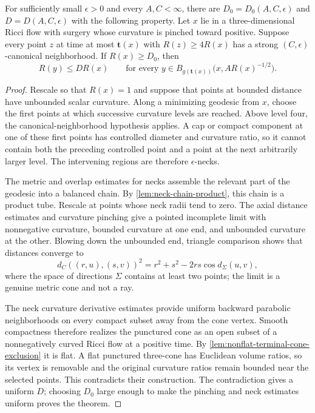 \begin{theorem}
\label{thm:bounded-curvature-at-bounded-distance}
\notready
For sufficiently small $\epsilon>0$ and every $A,C<\infty$, there are
$D_0=D_0(A,C,\epsilon)$ and $D=D(A,C,\epsilon)$ with the following
property.  Let $x$ lie in a three-dimensional Ricci flow with surgery whose
curvature is pinched toward positive.  Suppose every point $z$ at time at
most $\mathbf t(x)$ with $R(z)\ge4R(x)$ has a strong
$(C,\epsilon)$-canonical neighborhood.  If $R(x)\ge D_0$, then
\[
 R(y)\le D R(x)
 \qquad\text{for every }y\in
 B_{g(\mathbf t(x))}\bigl(x,A R(x)^{-1/2}\bigr).
\]
\end{theorem}

\begin{proof}
Rescale so that $R(x)=1$ and suppose that points at bounded distance have
unbounded scalar curvature.  Along a minimizing geodesic from $x$, choose
the first points at which successive curvature levels are reached.  Above
level four, the canonical-neighborhood hypothesis applies.  A cap or compact
component at one of these first points has controlled diameter and curvature
ratio, so it cannot contain both the preceding controlled point and a point
at the next arbitrarily larger level.  The intervening regions are therefore
$\epsilon$-necks.

The metric and overlap estimates for necks assemble the relevant part of the
geodesic into a balanced chain.  By \ref{lem:neck-chain-product}, this chain
is a product tube.  Rescale at points whose neck radii tend to zero.  The
axial distance estimates and curvature pinching give a pointed incomplete
limit with nonnegative curvature, bounded curvature at one end, and
unbounded curvature at the other.  Blowing down the unbounded end, triangle
comparison shows that distances converge to
\[
 d_C((r,u),(s,v))^2=r^2+s^2-2rs\cos d_\Sigma(u,v),
\]
where the space of directions $\Sigma$ contains at least two points; the
limit is a genuine metric cone and not a ray.

The neck curvature derivative estimates provide uniform backward parabolic
neighborhoods on every compact subset away from the cone vertex.  Smooth
compactness therefore realizes the punctured cone as an open subset of a
nonnegatively curved Ricci flow at a positive time.  By
\ref{lem:nonflat-terminal-cone-exclusion} it is flat.  A flat punctured
three-cone has Euclidean volume ratios, so its vertex is removable and the
original curvature ratios remain bounded near the selected points.  This
contradicts their construction.  The contradiction gives a uniform $D$;
choosing $D_0$ large enough to make the pinching and neck estimates uniform
proves the theorem.
\end{proof}

